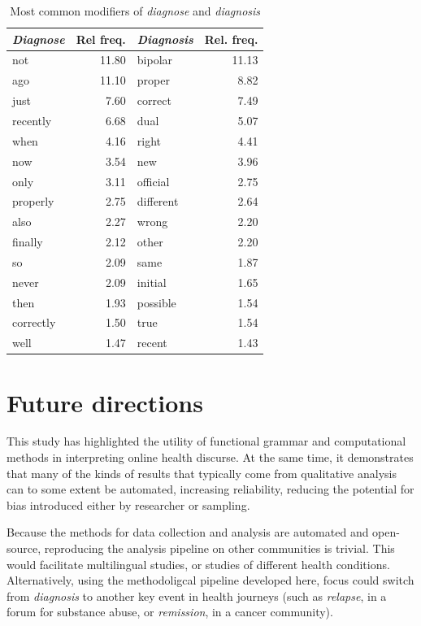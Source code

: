 \documentclass{article}
\begin{document}
\begin{table}[htb]
\begin{tabular}{lrlr}

\toprule
\emph{Diagnose}  & Rel freq.        & \emph{Diagnosis} & Rel. freq. \\
\midrule
not               &  11.80 & bipolar    &  11.13 \\
ago               &  11.10 & proper     &   8.82 \\
just              &   7.60 & correct    &   7.49 \\
recently          &   6.68 & dual       &   5.07 \\
when              &   4.16 & right      &   4.41 \\
now               &   3.54 & new        &   3.96 \\
only              &   3.11 & official   &   2.75 \\
properly          &   2.75 & different  &   2.64 \\
also              &   2.27 & wrong      &   2.20 \\
finally           &   2.12 & other      &   2.20 \\
so                &   2.09 & same       &   1.87 \\
never             &   2.09 & initial    &   1.65 \\
then              &   1.93 & possible   &   1.54 \\
correctly         &   1.50 & true       &   1.54 \\
well              &   1.47 & recent     &   1.43 \\
\bottomrule
\end{tabular}
\caption{Most common modifiers of \emph{diagnose} and \emph{diagnosis}}
\label{relfreq-diagnose-mods}
\end{table}

\section{Future directions}

This study has highlighted the utility of functional grammar and computational methods in interpreting online health discurse. At the same time, it demonstrates that many of the kinds of results that typically come from qualitative analysis can to some extent be automated, increasing reliability, reducing the potential for bias introduced either by researcher or sampling.

Because the methods for data collection and analysis are automated and open-source, reproducing the analysis pipeline on other communities is trivial. This would facilitate multilingual studies, or studies of different health conditions. Alternatively, using the methodoligcal pipeline developed here, focus could switch from \emph{diagnosis} to another key event in health journeys (such as \emph{relapse}, in a forum for substance abuse, or \emph{remission}, in a cancer community).
\end{document}
